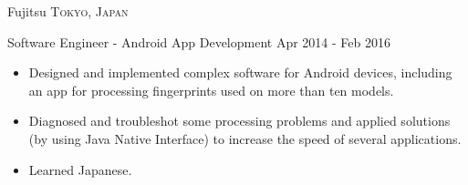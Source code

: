 \documentclass[10pt,a4paper]{article}
\begin{document}
  \headedsection
{Fujitsu}
{\textsc{Tokyo, Japan}}
{
  \headedsubsection
  {Software Engineer - Android App Development}
  {Apr 2014 - Feb 2016}
  {
    \begin{itemize}
    \item Designed and implemented complex software for Android devices, including an app for processing fingerprints used on more than ten models.
      
      
    \item Diagnosed and troubleshot some processing problems and applied solutions (by using Java Native Interface) to increase the speed of several applications.
    \item Learned Japanese.
      
      
    \end{itemize}
  }
}
\end{document}
